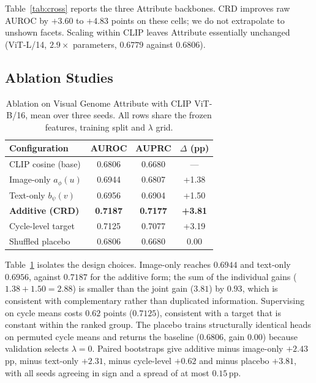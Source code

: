 Table~\ref{tab:cross} reports the three Attribute backbones. CRD improves raw AUROC
by $+3.60$ to $+4.83$ points on these cells; we do not extrapolate to unshown facets.
Scaling within CLIP leaves Attribute essentially unchanged (ViT-L/14, $2.9\times$
parameters, $0.6779$ against $0.6806$).

\subsection{Ablation Studies}
\begin{table}[t]
\centering
\small
\setlength{\tabcolsep}{5pt}
\caption{Ablation on Visual Genome Attribute with CLIP ViT-B/16, mean over three
seeds. All rows share the frozen features, training split and $\lambda$ grid.}
\label{tab:ablation}
\begin{tabular}{lccc}
\toprule
Configuration & AUROC & AUPRC & $\Delta$ (pp) \\
\midrule
CLIP cosine (base)      & 0.6806 & 0.6680 & ---    \\
Image-only $a_\phi(u)$  & 0.6944 & 0.6807 & +1.38  \\
Text-only $b_\psi(v)$   & 0.6956 & 0.6904 & +1.50  \\
\textbf{Additive (CRD)} & \textbf{0.7187} & \textbf{0.7177} & \textbf{+3.81} \\
Cycle-level target      & 0.7125 & 0.7077 & +3.19  \\
Shuffled placebo        & 0.6806 & 0.6680 & 0.00   \\
\bottomrule
\end{tabular}
\end{table}

Table~\ref{tab:ablation} isolates the design choices. Image-only reaches $0.6944$ and
text-only $0.6956$, against $0.7187$ for the additive form; the sum of the individual
gains ($1.38+1.50=2.88$) is smaller than the joint gain ($3.81$) by $0.93$, which is
consistent with complementary rather than duplicated information. Supervising on cycle means costs $0.62$ points
($0.7125$), consistent with a target that is constant within the ranked group. The
placebo trains structurally identical heads on permuted cycle means and returns the
baseline ($0.6806$, gain $0.00$) because validation selects $\lambda=0$. Paired
bootstraps give additive minus image-only $+2.43$\,pp, minus text-only $+2.31$,
minus cycle-level $+0.62$ and minus placebo $+3.81$, with all seeds agreeing in sign
and a spread of at most $0.15$\,pp.

